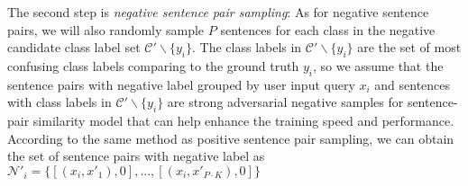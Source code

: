 \begin{table*}
  \begin{centering}
    \par
  \end{centering}
  \caption{Statistics for all datasets and few shot settings.}

  \label{tbe:dataset statistic}
\end{table*}


The  second  step  is  \emph{negative sentence pair sampling}: As for negative
sentence  pairs,  we will also randomly sample $P$ sentences for each class in
the negative candidate class label set $\mathcal{C'}\backslash \{y_{i}\}$. The
class  labels  in  $\mathcal{C'}\backslash  \{y_{i}\}$  are  the  set  of most
confusing  class  labels comparing to the ground truth ${y_{i}}$, so we assume
that  the  sentence  pairs  with  negative  label  grouped by user input query
$x_{i}$  and sentences with class labels in $\mathcal{C'}\backslash \{y_{i}\}$
are  strong  adversarial  negative  samples for sentence-pair similarity model
that  can  help  enhance  the training speed and performance. According to the
same  method  as  positive  sentence  pair  sampling, we can obtain the set of
sentence  pairs  with  negative label as $\mathcal{N'}_{i}=\{[(x_{i}, x'_{1}),
0], ..., [(x_{i}, x'_{P\cdot K}), 0]\}$

